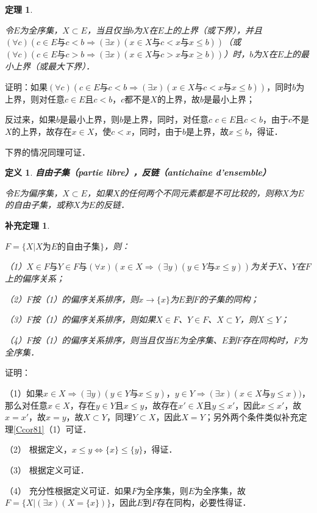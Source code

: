\documentclass[12pt, a4paper, oneside]{book}
\newtheorem{theo}{定理}
\newtheorem{cor}{补充定理}
\newtheorem{de}{定义}
\begin{document}
			\begin{theo}\label{theo70}
				\hfill\par
				令$E$为全序集，$X\subset E$，当且仅当$b$为$X$在$E$上的上界（或下界），并且$(\forall c)(c\in E\text{与}c<b\Rightarrow (\exists x)(x\in X\text{与}c<x\text{与}x\leq b))$（或$(\forall c)(c\in E\text{与}c>b\Rightarrow (\exists x)(x\in X\text{与}c>x\text{与}x\geq b))$）时，$b$为$X$在$E$上的最小上界（或最大下界）．
			\end{theo}
			证明：如果$(\forall c)(c\in E\text{与}c<b\Rightarrow (\exists x)(x\in X\text{与}c<x\text{与}x\leq b))$，同时$b$为上界，则对任意$c\in E$且$c<b$，$c$都不是$X$的上界，故$b$是最小上界；
			\par
			反过来，如果$b$是最小上界，则$b$是上界，同时，对任意$c$ $c\in E$且$c<b$，由于$c$不是$X$的上界，故存在$x\in X$，使$c<x$，同时，由于$b$是上界，故$x\leq b$，得证．
			\par
			下界的情况同理可证．
			
			\begin{de}
				\textbf{自由子集（partie libre），反链（antichaîne d'ensemble）}
				\par
				令$E$为偏序集，$X\subset E$，如果$X$的任何两个不同元素都是不可比较的，则称$X$为$E$的自由子集，或称$X$为$E$的反链．
			\end{de}

			\begin{cor}\label{cor193}
				\hfill\par
				$F=\{X|X\text{为}E\text{的自由子集}\}$，则：
				\par
				（1）$X\in F\text{与}Y\in F\text{与}(\forall x)(x\in X\Rightarrow (\exists y)(y\in Y\text{与}x\leq y))$为关于$X$、$Y$在$F$上的偏序关系；
				\par
				（2）$F$按（1）的偏序关系排序，则$x\to \{x\}$为$E$到$F$的子集的同构；
				\par
				（3）$F$按（1）的偏序关系排序，则如果$X\in F$、$Y\in F$、$X\subset Y$，则$X\leq Y$；
				\par
				（4）$F$按（1）的偏序关系排序，则当且仅当$E$为全序集、$E$到$F$存在同构时，F为全序集．
			\end{cor}
			证明：
			\par
			（1）如果$x\in X\Rightarrow (\exists y)(y\in Y\text{与}x\leq y)$，$y\in Y\Rightarrow (\exists x)(x\in X\text{与}y\leq x))$，那么对任意$x\in X$，存在$y\in Y$且$x\leq y$，故存在$x' \in X$且$y\leq x'$，因此$x\leq x'$，故$x=x'$，故$x=y$，故$X\subset Y$，同理$Y\subset X$，因此$X=Y$；另外两个条件类似补充定理\ref{Ccor81}（1）可证．
			\par
			（2）	根据定义，$x\leq y\Leftrightarrow \{x\}\leq \{y\}$，得证．
			\par
			（3）	根据定义可证．
			\par
			（4）	充分性根据定义可证．如果$F$为全序集，则$E$为全序集，故$F=\{X|(\exists x)(X=\{x\})\}$，因此$E$到$F$存在同构，必要性得证．
\end{document}
